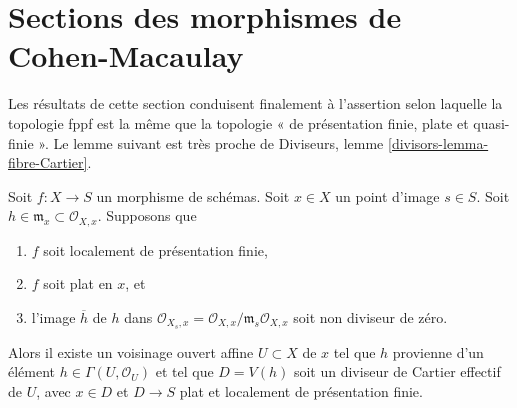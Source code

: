 \section{Sections des morphismes de Cohen-Macaulay}
\label{section-slicing-CM}

\noindent
Les résultats de cette section conduisent finalement à l'assertion selon laquelle
la topologie fppf est la même que la topologie
« de présentation finie, plate et quasi-finie ».
Le lemme suivant est très proche de
Diviseurs, lemme \ref{divisors-lemma-fibre-Cartier}.

\begin{lemma}
\label{lemma-slice-given-element}
Soit $f : X \to S$ un morphisme de schémas.
Soit $x \in X$ un point d'image $s \in S$.
Soit $h \in \mathfrak m_x \subset \mathcal{O}_{X, x}$.
Supposons que
\begin{enumerate}
\item $f$ soit localement de présentation finie,
\item $f$ soit plat en $x$, et
\item l'image $\overline{h}$ de $h$ dans
$\mathcal{O}_{X_s, x} = \mathcal{O}_{X, x}/\mathfrak m_s\mathcal{O}_{X, x}$
soit non diviseur de zéro.
\end{enumerate}
Alors il existe un voisinage ouvert affine $U \subset X$ de $x$
tel que $h$ provienne d'un élément $h \in \Gamma(U, \mathcal{O}_U)$ et
tel que $D = V(h)$ soit un diviseur de Cartier effectif de $U$, avec $x \in D$ et
$D \to S$ plat et localement de présentation finie.
\end{lemma}

